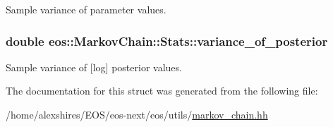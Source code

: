 Sample variance of parameter values. \hypertarget{structeos_1_1MarkovChain_1_1Stats_a42b880c3445149482c9b8516257dcd8a}{
\subsubsection[{variance\_\-of\_\-posterior}]{\setlength{\rightskip}{0pt plus 5cm}double {\bf eos::MarkovChain::Stats::variance\_\-of\_\-posterior}}}
\label{structeos_1_1MarkovChain_1_1Stats_a42b880c3445149482c9b8516257dcd8a}


Sample variance of \mbox{[}log\mbox{]} posterior values. 

The documentation for this struct was generated from the following file:\begin{DoxyCompactItemize}
\item 
/home/alexshires/EOS/eos-\/next/eos/utils/\hyperlink{markov__chain_8hh}{markov\_\-chain.hh}\end{DoxyCompactItemize}
